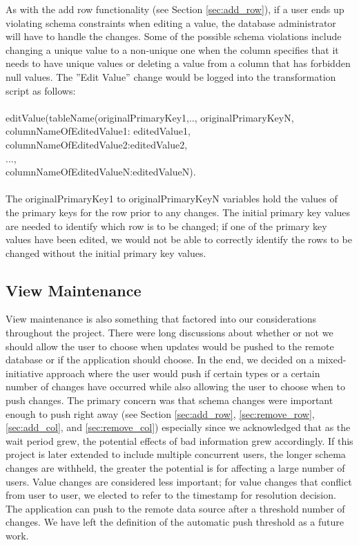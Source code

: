 \documentclass[12pt]{article}
\begin{document}
As with the add row functionality (see Section \ref{sec:add_row}), if a user ends up violating schema constraints when editing a value, the database administrator will have to handle the changes. Some of the possible schema violations include changing a unique value to a non-unique one when the column specifies that it needs to have unique values or deleting a value from a column that has forbidden null values. The ''Edit Value'' change would be logged into the transformation script as follows: \\ \\ 

\noindent editValue(tableName(originalPrimaryKey1,.., originalPrimaryKeyN, \\
\indent columnNameOfEditedValue1: editedValue1, \\
\indent columnNameOfEditedValue2:editedValue2, \\
\indent ..., \\
\indent columnNameOfEditedValueN:editedValueN). \\ \\

The originalPrimaryKey1 to originalPrimaryKeyN variables hold the values of the primary keys for the row prior to any changes. The initial primary key values are needed to identify which row is to be changed; if one of the primary key values have been edited, we would not be able to correctly identify the rows to be changed without the initial primary key values.

\subsection{View Maintenance}
View maintenance is also something that factored into our considerations throughout the project. There were long discussions about whether or not we should allow the user to choose when updates would be pushed to the remote database or if the application should choose. In the end, we decided on a mixed-initiative approach where the user would push if certain types or a certain number of changes have occurred while also allowing the user to choose when to push changes. The primary concern was that schema changes were important enough to push right away (see Section \ref{sec:add_row}, \ref{sec:remove_row}, \ref{sec:add_col}, and \ref{sec:remove_col}) especially since we acknowledged that as the wait period grew, the potential effects of bad information grew accordingly. If this project is later extended to include multiple concurrent users, the longer schema changes are withheld, the greater the potential is for affecting a large number of users. Value changes are considered less important; for value changes that conflict from user to user, we elected to refer to the timestamp for resolution decision. The application can push to the remote data source after a threshold number of changes. We have left the definition of the automatic push threshold as a future work.
\end{document}
